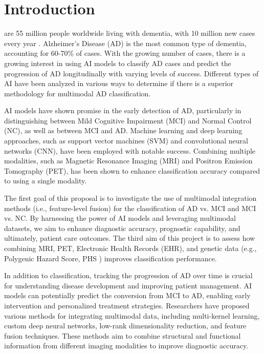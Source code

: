 \section{Introduction}
\label{sec:introduction}
 are 55 million people worldwide living with dementia, with 10 million new cases every year \cite{who_dementia_nodate}. Alzheimer's Disease (AD) is the most common type of dementia, accounting for 60-70\% of cases. With the growing number of cases, there is a growing interest in using AI models to classify AD cases and predict the progression of AD longitudinally with varying levels of success. Different types of AI have been analyzed in various ways to determine if there is a superior methodology for multimodal AD classification.

AI models have shown promise in the early detection of AD, particularly in distinguishing between Mild Cognitive Impairment (MCI) and Normal Control (NC), as well as between MCI and AD. Machine learning and deep learning approaches, such as support vector machines (SVM) and convolutional neural networks (CNN), have been employed with notable success. Combining multiple modalities, such as Magnetic Resonance Imaging (MRI) and Positron Emission Tomography (PET), has been shown to enhance classification accuracy compared to using a single modality.

The first goal of this proposal is to investigate the use of multimodal integration methods (i.e., feature-level fusion) for the classification of AD vs. MCI and MCI vs. NC. By harnessing the power of AI models and leveraging multimodal datasets, we aim to enhance diagnostic accuracy, prognostic capability, and ultimately, patient care outcomes. The third aim of this project is to assess how combining MRI, PET, Electronic Health Records (EHR), and genetic data (e.g., Polygenic Hazard Score, PHS \cite{desikan_genetic_2017}) improves classification performance.

In addition to classification, tracking the progression of AD over time is crucial for understanding disease development and improving patient management. AI models can potentially predict the conversion from MCI to AD, enabling early intervention and personalized treatment strategies. Researchers have proposed various methods for integrating multimodal data, including multi-kernel learning, custom deep neural networks, low-rank dimensionality reduction, and feature fusion techniques. These methods aim to combine structural and functional information from different imaging modalities to improve diagnostic accuracy.

